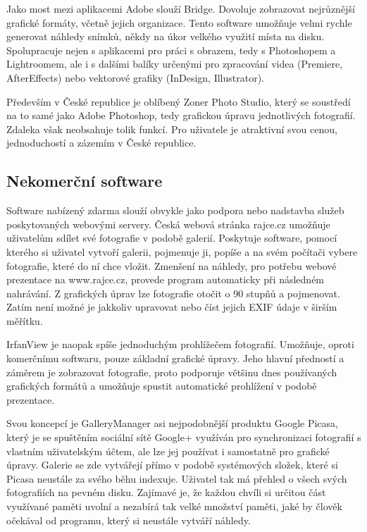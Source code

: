 \documentclass[11pt,twoside,a4paper]{book}
\begin{document}
\indent
Jako most mezi aplikacemi Adobe slouží Bridge. Dovoluje zobrazovat nejrůznější grafické formáty, včetně jejich organizace. Tento software umožňuje velmi rychle generovat náhledy snímků, někdy na úkor velkého využití místa na disku. Spolupracuje nejen s aplikacemi pro práci s obrazem, tedy s Photoshopem a Lightroomem, ale i s dalšími balíky určenými pro zpracování videa (Premiere, AfterEffects) nebo vektorové grafiky (InDesign, Illustrator).

\indent
Především v České republice je oblíbený Zoner Photo Studio, který se soustředí na to samé jako Adobe Photoshop, tedy grafickou úpravu jednotlivých fotografií. Zdaleka však neobsahuje tolik funkcí. Pro uživatele je atraktivní svou cenou, jednoduchostí a zázemím v České republice.

\subsection{Nekomerční software}
\noindent
Software nabízený zdarma slouží obvykle jako podpora nebo nadstavba služeb poskytovaných webovými servery. Česká webová stránka rajce.cz umožňuje uživatelům sdílet své fotografie v podobě galerií. Poskytuje software, pomocí kterého si uživatel vytvoří galerii, pojmenuje ji, popíše a na svém počítači vybere fotografie, které do ní chce vložit. Zmenšení na náhledy, pro potřebu webové prezentace na www.rajce.cz, provede program automaticky při následném nahrávání. Z grafických úprav lze fotografie otočit o 90 stupňů a pojmenovat. Zatím není možné je jakkoliv upravovat nebo číst jejich EXIF údaje v širším měřítku.

\indent
IrfanView je naopak spíše jednoduchým prohlížečem fotografií. Umožňuje, oproti komerčnímu softwaru, pouze základní grafické úpravy. Jeho hlavní předností a záměrem je zobrazovat fotografie, proto podporuje většinu dnes používaných grafických formátů a umožňuje spustit automatické prohlížení v podobě prezentace.

\indent
Svou koncepcí je GalleryManager asi nejpodobnější produktu Google Picasa, který je se spuštěním sociální sítě Google+ využíván pro synchronizaci fotografií s vlastním uživatelským účtem, ale lze jej používat i samostatně pro grafické úpravy. Galerie se zde vytvářejí přímo v podobě systémových složek, které si Picasa neustále za svého běhu indexuje. Uživatel tak má přehled o všech svých fotografiích na pevném disku. Zajímavé je, že každou chvíli si určitou část využívané paměti uvolní a nezabírá tak velké množství paměti, jaké by člověk očekával od programu, který si neustále vytváří náhledy.
\end{document}
